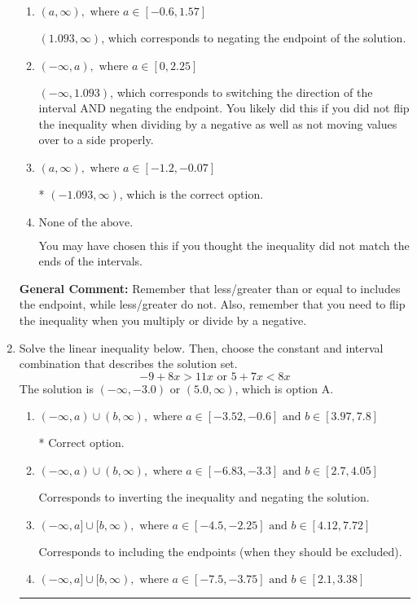 \documentclass{extbook}[14pt]
\newcommand{\litem}[1]{\item #1

\rule{\textwidth}{0.4pt}}
\begin{document}
\begin{enumerate}
{\begin{enumerate}[label=\Alph*.]
 $(-\infty, -1.093)$, which corresponds to switching the direction of the interval. You likely did this if you did not flip the inequality when dividing by a negative!
\item \( (a, \infty), \text{ where } a \in [-0.6, 1.57] \)

 $(1.093, \infty)$, which corresponds to negating the endpoint of the solution.
\item \( (-\infty, a), \text{ where } a \in [0, 2.25] \)

 $(-\infty, 1.093)$, which corresponds to switching the direction of the interval AND negating the endpoint. You likely did this if you did not flip the inequality when dividing by a negative as well as not moving values over to a side properly.
\item \( (a, \infty), \text{ where } a \in [-1.2, -0.07] \)

* $(-1.093, \infty)$, which is the correct option.
\item \( \text{None of the above}. \)

You may have chosen this if you thought the inequality did not match the ends of the intervals.
\end{enumerate}

\textbf{General Comment:} Remember that less/greater than or equal to includes the endpoint, while less/greater do not. Also, remember that you need to flip the inequality when you multiply or divide by a negative.
}
\litem{
Solve the linear inequality below. Then, choose the constant and interval combination that describes the solution set.
\[ -9 + 8 x > 11 x \text{ or } 5 + 7 x < 8 x \]The solution is \( (-\infty, -3.0) \text{ or } (5.0, \infty) \), which is option A.\begin{enumerate}[label=\Alph*.]
\item \( (-\infty, a) \cup (b, \infty), \text{ where } a \in [-3.52, -0.6] \text{ and } b \in [3.97, 7.8] \)

 * Correct option.
\item \( (-\infty, a) \cup (b, \infty), \text{ where } a \in [-6.83, -3.3] \text{ and } b \in [2.7, 4.05] \)

Corresponds to inverting the inequality and negating the solution.
\item \( (-\infty, a] \cup [b, \infty), \text{ where } a \in [-4.5, -2.25] \text{ and } b \in [4.12, 7.72] \)

Corresponds to including the endpoints (when they should be excluded).
\item \( (-\infty, a] \cup [b, \infty), \text{ where } a \in [-7.5, -3.75] \text{ and } b \in [2.1, 3.38] \)


\end{enumerate}}
\end{enumerate}
\end{document}
